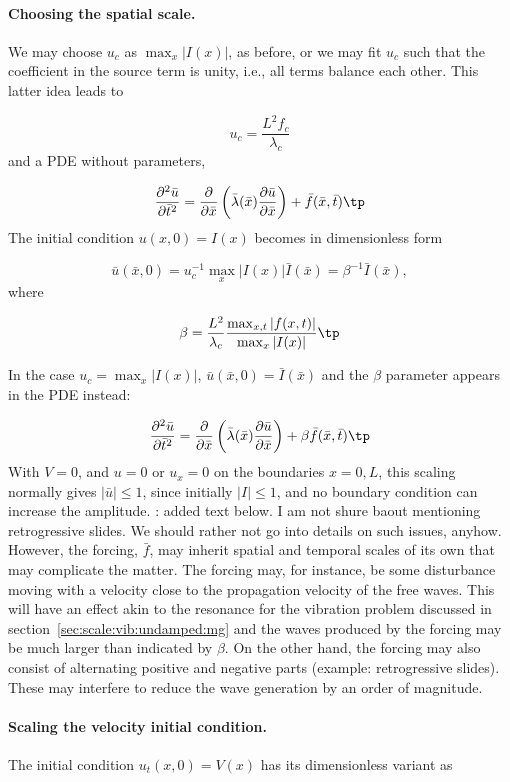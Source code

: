 \documentclass[graybox,envcountchap,sectrefs,final]{svmonodo}
\newcommand{\longinlinecomment}[3]{{\color{red}{\bf #1}: #2}}
\begin{document}
\paragraph{Choosing the spatial scale.}
We may choose $u_c$ as $\max_x |I(x)|$, as before,
or we may fit $u_c$ such that the coefficient in the source term
is unity, i.e., all terms balance each other.
This latter idea leads to

\[ u_c = \frac{L^2 f_c}{\lambda_c} \]
and a PDE without parameters,

\[
\frac{\partial^2 \bar u}{\partial \bar t^2} =
\frac{\partial}{\partial \bar x}\left(
\bar\lambda(\bar x) {\partial\bar u\over\partial\bar x}\right)
+ \bar f(\bar x,\bar t)\tp
\]
The initial condition $u(x,0)=I(x)$ becomes in dimensionless form

\[ \bar u(\bar x, 0) = u_c^{-1} \max_x |I(x)|\bar I(\bar x) =
\beta^{-1}\bar I(\bar x),\]
where

\[ \beta = \frac{L^2}{\lambda_c}\frac{\max_{x,t} |f(x,t)|}{\max_x|I(x)|}\tp\]

In the case $u_c=\max_x|I(x)|$, $\bar u(\bar x,0)=\bar I(\bar x)$ and
the $\beta$ parameter appears in the PDE instead:

\[
\frac{\partial^2 \bar u}{\partial \bar t^2} =
\frac{\partial}{\partial \bar x}\left(
\bar\lambda(\bar x) {\partial\bar u\over\partial\bar x}\right)
+ \beta \bar f(\bar x,\bar t)\tp
\]
With $V=0$, and $u=0$ or $u_x=0$ on the boundaries $x=0,L$, this scaling normally gives
$|\bar u|\leq 1$, since initially $|I|\leq 1$, and no boundary condition
can increase the amplitude.
\longinlinecomment{Geir 3}{ added text below. I am not shure baout mentioning retrogressive slides. We should rather not go into details on such issues, anyhow. }{ added text below. I }
However, the forcing, $\bar f$, may inherit spatial and temporal scales of its
own that may complicate the matter. The forcing may, for instance, be
some disturbance moving with a velocity close to the propagation velocity of
the free waves. This will have an effect akin to the resonance for the vibration problem discussed in
section~\ref{sec:scale:vib:undamped:mg} and the waves produced by the forcing may be much larger than
indicated by $\beta$. On the other hand, the forcing may also consist
of alternating positive and negative parts (example: retrogressive slides). These may interfere to
reduce the wave generation by an order of magnitude.
\paragraph{Scaling the velocity initial condition.}
The initial condition $u_t(x,0)=V(x)$ has its dimensionless variant as
\end{document}
